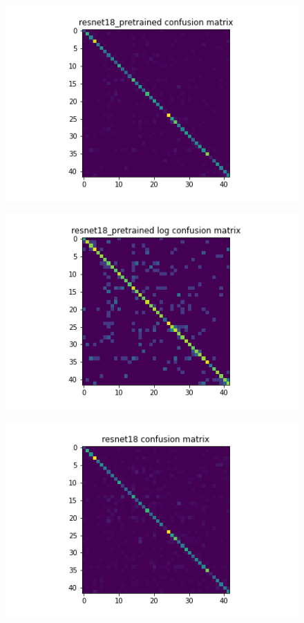 \begin{figure}[H]
  \begin{minipage}[b]{.5\linewidth}
    \centering
    {\includegraphics[width=1.2\textwidth]{figs/conf_matrix/resnet18_pretrained_conf.png}}
  \end{minipage}
  \hfill
  \begin{minipage}[b]{.5\linewidth}
    \centering
    {\includegraphics[width=1.2\textwidth]{figs/conf_matrix/resnet18_pretrained_log_conf.png}}
  \end{minipage}
  \vfill
  \begin{minipage}[b]{.5\linewidth}
    \centering
    {\includegraphics[width=1.2\textwidth]{figs/conf_matrix/resnet18_conf.png}}

\end{minipage}
\end{figure}
